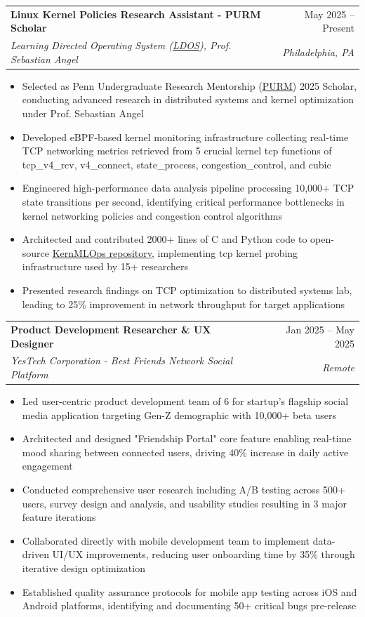 \documentclass[letterpaper,11pt]{article}
\makeatletter
\newcommand{\resumeItem}[1]{
  \item\small{
    {#1 \vspace{-3pt}}
  }
}
\newcommand{\resumeSubheading}[4]{
  \vspace{-2pt}\item
    \begin{tabular*}{0.97\textwidth}[t]{l@{\extracolsep{\fill}}r}
      \textbf{#1} & #2 \\
      \textit{\small#3} & \textit{\small #4} \\
    \end{tabular*}\vspace{-7pt}
}
\newcommand{\resumeItemListStart}{\begin{itemize}}
\newcommand{\resumeItemListEnd}{\end{itemize}\vspace{-5pt}}
\makeatother
\begin{document}
    \resumeSubheading
      {Linux Kernel Policies Research Assistant - PURM Scholar}{May 2025 -- Present}
      {Learning Directed Operating System (\href{https://ldos.utexas.edu/}{\underline{LDOS}}), Prof. Sebastian Angel}{Philadelphia, PA}
      \resumeItemListStart
        \resumeItem{Selected as Penn Undergraduate Research Mentorship (\href{https://curf.upenn.edu/content/penn-undergraduate-research-mentoring-program-purm}{\underline{PURM}}) 2025 Scholar, conducting advanced research in distributed systems and kernel optimization under Prof. Sebastian Angel}
        \resumeItem{Developed eBPF-based kernel monitoring infrastructure collecting real-time TCP networking metrics retrieved from 5 crucial kernel tcp functions of tcp\_v4\_rcv, v4\_connect, state\_process, congestion\_control, and cubic}
        \resumeItem{Engineered high-performance data analysis pipeline processing 10,000+ TCP state transitions per second, identifying critical performance bottlenecks in kernel networking policies and congestion control algorithms}
        \resumeItem{Architected and contributed 2000+ lines of C and Python code to open-source \href{https://github.com/tonytgrt/KernMLOps/tree/main}{\underline{KernMLOps repository}}, implementing tcp kernel probing infrastructure used by 15+ researchers}
        \resumeItem{Presented research findings on TCP optimization to distributed systems lab, leading to 25\% improvement in network throughput for target applications}
    \resumeItemListEnd

    \resumeSubheading
      {Product Development Researcher \& UX Designer}{Jan 2025 -- May 2025}
      {YesTech Corporation - Best Friends Network Social Platform}{Remote}
      \resumeItemListStart
        \resumeItem{Led user-centric product development team of 6 for startup's flagship social media application targeting Gen-Z demographic with 10,000+ beta users}
        \resumeItem{Architected and designed "Friendship Portal" core feature enabling real-time mood sharing between connected users, driving 40\% increase in daily active engagement}
        \resumeItem{Conducted comprehensive user research including A/B testing across 500+ users, survey design and analysis, and usability studies resulting in 3 major feature iterations}
        \resumeItem{Collaborated directly with mobile development team to implement data-driven UI/UX improvements, reducing user onboarding time by 35\% through iterative design optimization}
        \resumeItem{Established quality assurance protocols for mobile app testing across iOS and Android platforms, identifying and documenting 50+ critical bugs pre-release}
    \resumeItemListEnd
\end{document}
